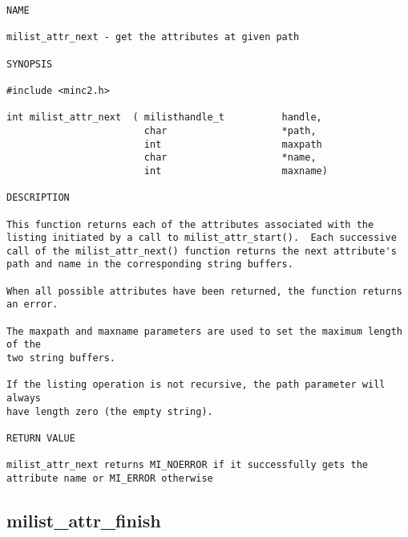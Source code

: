 \documentclass{article}
\begin{document}
\begin{verbatim}
NAME 

milist_attr_next - get the attributes at given path

SYNOPSIS

#include <minc2.h>

int milist_attr_next  ( milisthandle_t          handle,
                        char                    *path,
                        int                     maxpath
                        char                    *name,
                        int                     maxname)

DESCRIPTION

This function returns each of the attributes associated with the
listing initiated by a call to milist_attr_start().  Each successive
call of the milist_attr_next() function returns the next attribute's
path and name in the corresponding string buffers.  

When all possible attributes have been returned, the function returns
an error.

The maxpath and maxname parameters are used to set the maximum length of the
two string buffers.

If the listing operation is not recursive, the path parameter will always
have length zero (the empty string).

RETURN VALUE

milist_attr_next returns MI_NOERROR if it successfully gets the
attribute name or MI_ERROR otherwise

\end{verbatim}

\subsection{milist\_attr\_finish}
\end{document}
